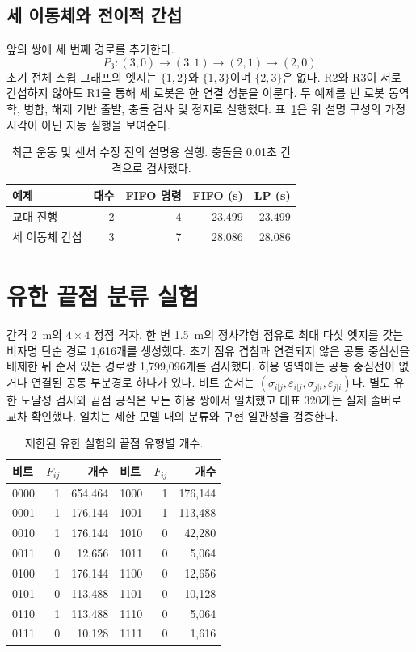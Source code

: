 \documentclass[11pt,a4paper]{article}
\theoremstyle{remark}
\begin{document}
\subsection{세 이동체와 전이적 간섭}
앞의 쌍에 세 번째 경로를 추가한다.
\begin{equation}
 P_3:(3,0)\to(3,1)\to(2,1)\to(2,0)
 \label{eq:third}
\end{equation}
초기 전체 스윕 그래프의 엣지는 $\{1,2\}$와 $\{1,3\}$이며 $\{2,3\}$은 없다. R2와 R3이 서로 간섭하지 않아도 R1을 통해 세 로봇은 한 연결 성분을 이룬다. 두 예제를 빈 로봇 동역학, 병합, 해제 기반 출발, 충돌 검사 및 정지로 실행했다. 표~\ref{tab:small}은 위 설명 구성의 가정 시각이 아닌 자동 실행을 보여준다.
\begin{table}[htbp]
\centering
\caption{최근 운동 및 센서 수정 전의 설명용 실행. 충돌을 0.01초 간격으로 검사했다.}
\label{tab:small}
\begin{tabular}{lrrrr}
\toprule
예제 & 대수 & FIFO 명령 & FIFO (s) & LP (s)\\
\midrule
교대 진행 & 2 & 4 & 23.499 & 23.499\\
세 이동체 간섭 & 3 & 7 & 28.086 & 28.086\\
\bottomrule
\end{tabular}
\end{table}

\section{유한 끝점 분류 실험}
간격 2~m의 $4\times4$ 정점 격자, 한 변 1.5~m의 정사각형 점유로 최대 다섯 엣지를 갖는 비자명 단순 경로 1,616개를 생성했다. 초기 점유 겹침과 연결되지 않은 공통 중심선을 배제한 뒤 순서 있는 경로쌍 1,799,096개를 검사했다. 허용 영역에는 공통 중심선이 없거나 연결된 공통 부분경로 하나가 있다. 비트 순서는 $(\sigma_{i|j},\varepsilon_{i|j},\sigma_{j|i},\varepsilon_{j|i})$다. 별도 유한 도달성 검사와 끝점 공식은 모든 허용 쌍에서 일치했고 대표 320개는 실제 솔버로 교차 확인했다. 일치는 제한 모델 내의 분류와 구현 일관성을 검증한다.
\begin{table}[htbp]
\centering
\caption{제한된 유한 실험의 끝점 유형별 개수.}
\label{tab:classification}
\begin{tabular}{lrr@{\qquad}lrr}
\toprule
비트 & $F_{ij}$ & 개수 & 비트 & $F_{ij}$ & 개수\\
\midrule
0000 & 1 & 654,464 & 1000 & 1 & 176,144\\
0001 & 1 & 176,144 & 1001 & 1 & 113,488\\
0010 & 1 & 176,144 & 1010 & 0 & 42,280\\
0011 & 0 & 12,656 & 1011 & 0 & 5,064\\
0100 & 1 & 176,144 & 1100 & 0 & 12,656\\
0101 & 0 & 113,488 & 1101 & 0 & 10,128\\
0110 & 1 & 113,488 & 1110 & 0 & 5,064\\
0111 & 0 & 10,128 & 1111 & 0 & 1,616\\
\bottomrule
\end{tabular}
\end{table}
\end{document}
